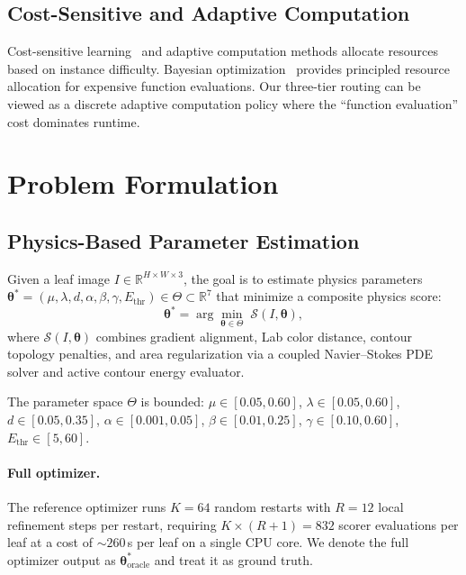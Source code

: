 \documentclass[11pt,a4paper]{article}
\newcommand{\btheta}{\boldsymbol{\theta}}
\newcommand{\cS}{\mathcal{S}}
\newcommand{\Real}{\mathbb{R}}
\begin{document}
\subsection{Cost-Sensitive and Adaptive Computation}

Cost-sensitive learning~\cite{trapeznikov2013supervised} and adaptive
computation methods allocate resources based on instance difficulty.
Bayesian optimization~\cite{shahriari2016taking} provides principled
resource allocation for expensive function evaluations.
Our three-tier routing can be viewed as a discrete adaptive computation
policy where the ``function evaluation'' cost dominates runtime.

\section{Problem Formulation}
\label{sec:problem}

\subsection{Physics-Based Parameter Estimation}

Given a leaf image $I \in \Real^{H \times W \times 3}$, the goal is to estimate
physics parameters $\btheta^* = (\mu, \lambda, d, \alpha, \beta, \gamma, E_\text{thr}) \in \Theta \subset \Real^7$
that minimize a composite physics score:
\begin{equation}
\btheta^* = \arg\min_{\btheta \in \Theta} \; \cS(I, \btheta),
\label{eq:optimization}
\end{equation}
where $\cS(I, \btheta)$ combines gradient alignment, Lab color distance,
contour topology penalties, and area regularization via a coupled
Navier--Stokes PDE solver and active contour energy evaluator.

The parameter space $\Theta$ is bounded:
$\mu \in [0.05, 0.60]$, $\lambda \in [0.05, 0.60]$, $d \in [0.05, 0.35]$,
$\alpha \in [0.001, 0.05]$, $\beta \in [0.01, 0.25]$, $\gamma \in [0.10, 0.60]$,
$E_\text{thr} \in [5, 60]$.

\paragraph{Full optimizer.}
The reference optimizer runs $K=64$ random restarts with $R=12$ local refinement
steps per restart, requiring $K \times (R+1) = 832$ scorer evaluations per leaf
at a cost of ${\sim}260$\,s per leaf on a single CPU core.
We denote the full optimizer output as $\btheta^*_\text{oracle}$ and treat it as
ground truth.
\end{document}
